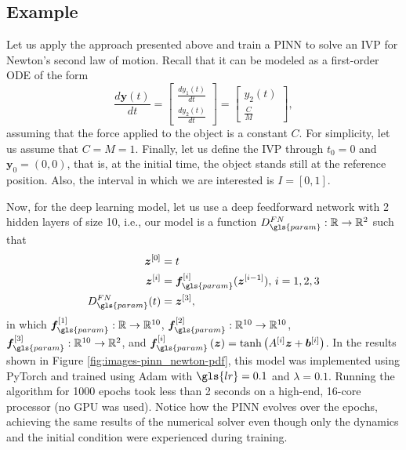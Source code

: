 \subsection*{Example}

Let us apply the approach presented above and train a \gls{PINN} to solve an \gls{IVP} for Newton's second law of motion.
Recall that it can be modeled as a first-order \gls{ODE} of the form
\[
    \frac{d \bm{y}(t)}{dt} = \begin{bmatrix} \frac{d y_1(t)}{dt} \\ \frac{d y_2(t)}{dt} \end{bmatrix} = \begin{bmatrix} y_2(t) \\ \frac{C}{M} \end{bmatrix} 
,\]
assuming that the force applied to the object is a constant $C$.
For simplicity, let us assume that $C=M=1$.
Finally, let us define the \gls{IVP} through $t_0=0$ and $\bm{y}_0=\left( 0,0 \right) $, that is, at the initial time, the object stands still at the reference position.
Also, the interval in which we are interested is $I=\left[ 0,1 \right] $.

Now, for the deep learning model, let us use a deep feedforward network with 2 hidden layers of size 10, i.e., our model is a function $D^{FN}_{\gls{param}}:\R\to \R^2$ such that
\begin{align*}
    \bm{z}^{[0]} &= t \\
    \bm{z}^{[i]} &= \bm{f}_{\gls{param}}^{[i]}(\bm{z}^{[i-1]}),\,i=1,2,3 \\
    D_{\gls{param}}^{FN}(t) &= \bm{z}^{[3]}
,\end{align*}
in which $\bm{f}_{\gls{param}}^{[1]}:\R\to \R^{10}$, $\bm{f}_{\gls{param}}^{[2]}:\R^{10}\to \R^{10}$, $\bm{f}_{\gls{param}}^{[3]}:\R^{10}\to \R^2$, and $\bm{f}_{\gls{param}}^{[i]}\left( \bm{z} \right) =\tanh\left( A^{[i]}\bm{z} + \bm{b}^{[i]} \right) $.
In the results shown in Figure \ref{fig:images-pinn_newton-pdf}, this model was implemented using PyTorch \cite{paszke_pytorch_2019} and trained using Adam with $\gls{lr} = 0.1$ and $\lambda=0.1$.
Running the algorithm for 1000 epochs took less than 2 seconds on a high-end, 16-core processor (no GPU was used).
Notice how the \gls{PINN} evolves over the epochs, achieving the same results of the numerical solver even though only the dynamics and the initial condition were experienced during training.


